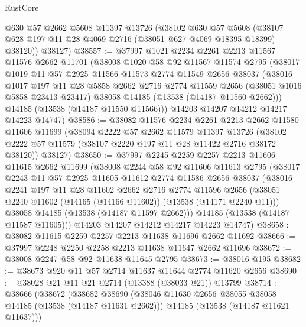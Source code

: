 \begin{lexlean}{RustCore}
\begin{coremodule}
      @630
      @57
      @2662
      @5608
      @11397
      @13726
      (@38102
        @630
        @57
        @5608
        (@38107 @628 @197 @11 @28 @4069 @2716 (@38051 @627 @4069 @18395 @18399) @38120))
      @38127)
@38557 := @37997
    @1021
    @2234
    @2261
    @2213
    @11567
    @11576
    @2662
    @11701
    (@38008
      @1020
      @58
      @92
      @11567
      @11574
      @2795
      (@38017
        @1019
        @11
        @57
        @2925
        @11566
        @11573
        @2774
        @11549
        @2656
        @38037
        (@38016
          @1017
          @197
          @11
          @28
          @5858
          @2662
          @2716
          @2774
          @11559
          @2656
          (@38051 @1016 @5858 @23413 @23417)
          @38058
          @14185
          (@13538 (@14187 @11560 @2662)))
        @14185
        (@13538 (@14187 @11550 @11566)))
      @14203
      @14207
      @14212
      @14217
      @14223
      @14747)
@38586 := @38082
    @11576
    @2234
    @2261
    @2213
    @2662
    @11580
    @11606
    @11699
    (@38094
      @2222
      @57
      @2662
      @11579
      @11397
      @13726
      (@38102 @2222 @57 @11579 (@38107 @2220 @197 @11 @28 @11422 @2716 @38172 @38120))
      @38127)
@38650 := @37997
    @2245
    @2259
    @2257
    @2213
    @11606
    @11615
    @2662
    @11699
    (@38008
      @2244
      @58
      @92
      @11606
      @11613
      @2795
      (@38017
        @2243
        @11
        @57
        @2925
        @11605
        @11612
        @2774
        @11586
        @2656
        @38037
        (@38016
          @2241
          @197
          @11
          @28
          @11602
          @2662
          @2716
          @2774
          @11596
          @2656
          (@38051 @2240 @11602 (@14165 (@14166 @11602)) (@13538 (@14171 @2240 @11)))
          @38058
          @14185
          (@13538 (@14187 @11597 @2662)))
        @14185
        (@13538 (@14187 @11587 @11605)))
      @14203
      @14207
      @14212
      @14217
      @14223
      @14747)
@38658 := @38082 @11615 @2259 @2257 @2213 @11638 @11696 @2662 @11692
@38666 := @37997 @2248 @2250 @2258 @2213 @11638 @11647 @2662 @11696
@38672 := @38008 @2247 @58 @92 @11638 @11645 @2795
@38673 := @38016 @195
@38682 := @38673 @920 @11 @57 @2714 @11637 @11644 @2774 @11620 @2656
@38690 := @38028 @21 @11 @21 @2714 (@13388 (@38033 @21)) @13799
@38714 := @38666
    (@38672
      (@38682
        @38690
        (@38046 @11630 @2656 @38055 @38058 @14185 (@13538 (@14187 @11631 @2662)))
        @14185
        (@13538 (@14187 @11621 @11637)))

\end{coremodule}
\end{lexlean}
